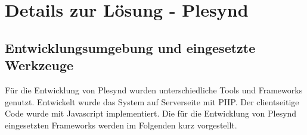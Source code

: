 \chapter{Details zur Lösung - Plesynd} 
\label{chapter:Kapitel6}

\section{Entwicklungsumgebung und eingesetzte Werkzeuge}\label{section:entwicklungsumgebungen_tools}
Für die Entwicklung von Plesynd wurden unterschiedliche Tools und Frameworks genutzt. Entwickelt wurde das System auf Serverseite mit PHP. Der clientseitige Code wurde mit Javascript implementiert. Die für die Entwicklung von Plesynd eingesetzten Frameworks werden im Folgenden kurz vorgestellt.

